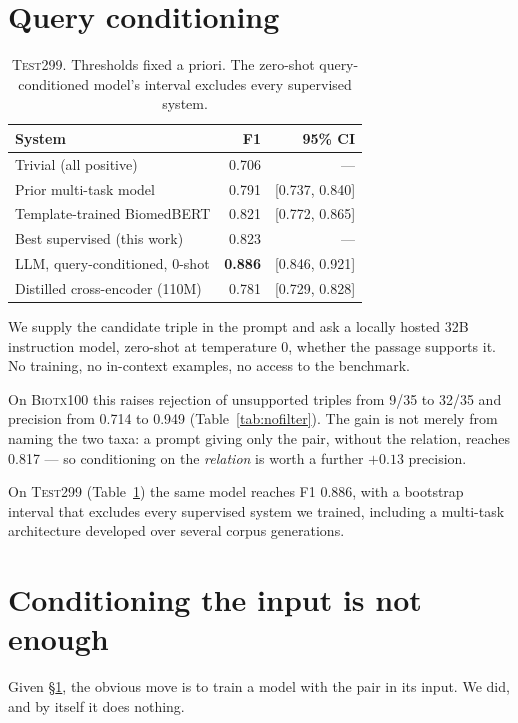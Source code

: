 \documentclass[11pt]{article}
\begin{document}
\section{Query conditioning}
\label{sec:querycond}

\begin{table}[t]\centering\small
\begin{tabular}{lrr}
\toprule
System & F1 & 95\% CI \\
\midrule
Trivial (all positive)          & 0.706 & --- \\
Prior multi-task model          & 0.791 & [0.737, 0.840] \\
Template-trained BiomedBERT     & 0.821 & [0.772, 0.865] \\
Best supervised (this work)     & 0.823 & --- \\
\midrule
LLM, query-conditioned, 0-shot  & \textbf{0.886} & [0.846, 0.921] \\
Distilled cross-encoder (110M)  & 0.781 & [0.729, 0.828] \\
\bottomrule
\end{tabular}
\caption{\textsc{Test299}. Thresholds fixed a priori. The zero-shot query-conditioned model's
interval excludes every supervised system.}
\label{tab:test299}
\end{table}

We supply the candidate triple in the prompt and ask a locally hosted 32B instruction model,
zero-shot at temperature 0, whether the passage supports it. No training, no in-context
examples, no access to the benchmark.

On \textsc{Biotx100} this raises rejection of unsupported triples from 9/35 to 32/35 and
precision from 0.714 to 0.949 (Table~\ref{tab:nofilter}). The gain is not merely from naming
the two taxa: a prompt giving only the pair, without the relation, reaches 0.817 --- so
conditioning on the \emph{relation} is worth a further $+0.13$ precision.

On \textsc{Test299} (Table~\ref{tab:test299}) the same model reaches F1 0.886, with a bootstrap
interval that excludes every supervised system we trained, including a multi-task architecture
developed over several corpus generations.

\section{Conditioning the input is not enough}
\label{sec:supervision}

Given \S\ref{sec:querycond}, the obvious move is to train a model with the pair in its input.
We did, and by itself it does nothing.
\end{document}

